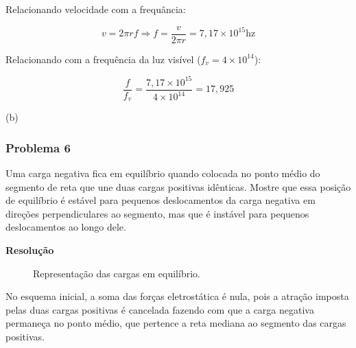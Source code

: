 \documentclass[a4paper, 12pt]{article}
\begin{document}
	Relacionando velocidade com a frequância:
	
	\[
	v=2\pi rf\Rightarrow f=\frac{v}{2\pi r}=7,17 \times 1{0}^{ 15 }\text{hz}
	\]
	
	Relacionando com a frequência da luz visível ($f_v=4\times 10^{14}$):
	
	\[
	\frac{f}{f_v}=\frac{7,17 \times 1{0}^{ 15 }}{4\times 10^{14}}=17,925
	\]
	
	(b)
	
	\subsubsection{Problema 6}
	
	Uma carga negativa fica em equilíbrio quando colocada no ponto médio do segmento de reta que une duas cargas positivas idênticas. Mostre que essa posição de equilíbrio é estável para pequenos deslocamentos da carga negativa em direções perpendiculares ao segmento, mas que é instável para pequenos deslocamentos ao longo dele.
	
	\textbf{Resolução}
	\begin{figure}[ht] %
		\centering
		\caption{Representação das cargas em equilíbrio.}
		\label{fig:cargas em equilibrio}
	\end{figure}
	
	No esquema inicial, a soma das forças eletrostática é nula, pois a atração imposta pelas duas cargas positivas é cancelada fazendo com que a carga negativa permaneça no ponto médio, que pertence a reta mediana ao segmento das cargas positivas.
	
\end{document}
